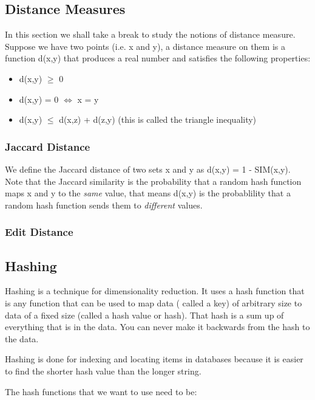 \documentclass[12pt]{article}
\begin{document}
\subsection{Distance Measures}

In this section we shall take a break to study the notions of distance measure.
Suppose we have two points (i.e. x and y), a distance measure on them is a function d(x,y) that produces a real number and satisfies the following properties:
\begin{itemize}
\item d(x,y) $\geq$ 0 

\item d(x,y) = 0 $\iff$ x = y 

\item d(x,y) $\leq$ d(x,z) + d(z,y) (this is called the triangle inequality)
\end{itemize}


\subsubsection{Jaccard Distance}

We define the Jaccard distance of two sets x and y as d(x,y) = 1 - SIM(x,y). Note that the Jaccard similarity is the probability that a random hash function maps x and y to the \textit{same} value, that means d(x,y) is the probablility that a random hash function sends them to \textit{different} values.

\subsubsection{Edit Distance}


\subsection{Hashing}

Hashing is a technique for dimensionality reduction. It uses a hash function that is any function that can be used to map data ( called a key) of arbitrary size to data of a fixed size (called a hash value or hash). That hash is a sum up of everything that is in the data. You can never make it backwards from the hash to the data.

Hashing is done for indexing and locating items in databases because it is easier to find the shorter hash value than the longer string.

The hash functions that we want to use need to be: 
\end{document}
